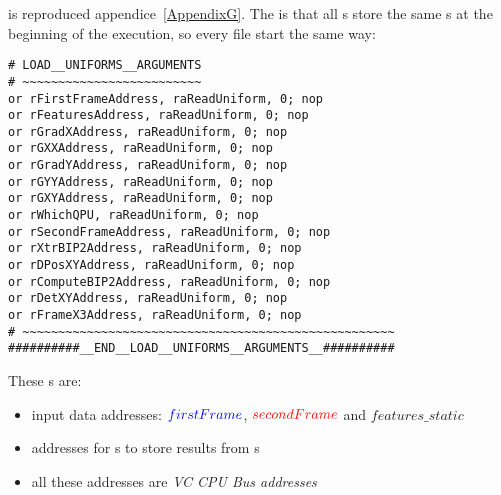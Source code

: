  is reproduced appendice~\ref{AppendixG}. The  is that all \qpu{}s store the same \uni{}s at the beginning of the execution, so every  file start the same way:
\newpage

\begin{lstlisting}
# LOAD__UNIFORMS__ARGUMENTS
# ~~~~~~~~~~~~~~~~~~~~~~~~~
or rFirstFrameAddress, raReadUniform, 0; nop
or rFeaturesAddress, raReadUniform, 0; nop
or rGradXAddress, raReadUniform, 0; nop
or rGXXAddress, raReadUniform, 0; nop
or rGradYAddress, raReadUniform, 0; nop
or rGYYAddress, raReadUniform, 0; nop
or rGXYAddress, raReadUniform, 0; nop
or rWhichQPU, raReadUniform, 0; nop
or rSecondFrameAddress, raReadUniform, 0; nop
or rXtrBIP2Address, raReadUniform, 0; nop
or rDPosXYAddress, raReadUniform, 0; nop
or rComputeBIP2Address, raReadUniform, 0; nop
or rDetXYAddress, raReadUniform, 0; nop
or rFrameX3Address, raReadUniform, 0; nop
# ~~~~~~~~~~~~~~~~~~~~~~~~~~~~~~~~~~~~~~~~~~~~~~~~~~~~
##########__END__LOAD__UNIFORMS__ARGUMENTS__##########
\end{lstlisting}

These \uni{}s are:
\begin{itemize}
	\item input data addresses: $\textcolor{blue}{firstFrame}$, $\textcolor{red}{secondFrame}$ and $features\_static$
	\item addresses for \qpu{}s to store results from s
	\item all these addresses are \emph{VC CPU Bus addresses}
\end{itemize}

